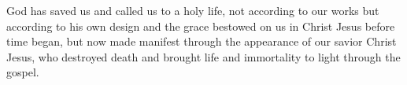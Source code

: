 
\lettrine{G}{}od has saved us and called us to a holy life, not according to our works but according to his own design and the grace bestowed on us in Christ Jesus before time began, but now made manifest through the appearance of our savior Christ Jesus, who destroyed death and brought life and immortality to light through the gospel.